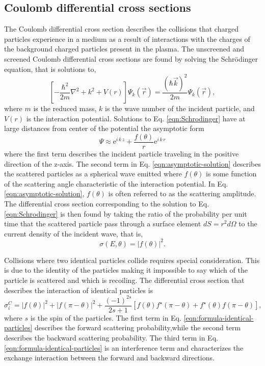 \subsection{Coulomb differential cross sections}
The Coulomb differential cross section describes the collisions that charged particles experience in a medium as a result of interactions with the charges of the background charged particles present in the plasma. The unscreened and screened Coulomb differential cross sections are found by solving the Schr\"{o}dinger equation, that is solutions to,
\begin{equation} \label{eqn:Schrodinger}
    \left[-\dfrac{\hbar^2}{2 m}\nabla^2 + k^2 + V(r)\right] \Psi_k(\vec{r}) = \dfrac{(\hbar \vec{k})^2}{2m} \Psi_k(\vec{r}),
\end{equation}
where $m$ is the reduced mass, $k$ is the wave number of the incident particle, and $V(r)$ is the interaction potential. Solutions to Eq. \eqref{eqn:Schrodinger} have at large distances from center of the potential the asymptotic form 
\begin{equation}  \label{eqn:asymptotic-solution}
    \Psi \approx \text{e}^{i\,k\,z} + \dfrac{f(\theta)}{r}\text{e}^{i\,k\,r}
\end{equation}
where the first term describes the incident particle traveling in the positive direction of the z-axis. The second term in Eq. \eqref{eqn:asymptotic-solution} describes the scattered particles as a spherical wave emitted where $f(\theta)$ is some function of the scattering angle characteristic of the interaction potential. In Eq. \eqref{eqn:asymptotic-solution}, $f(\theta)$ is often referred to as the scattering amplitude. The differential cross section corresponding to the solution to Eq. \eqref{eqn:Schrodinger} is then found by taking the ratio of the probability per unit time that the scattered particle pass through a surface element $dS = r^2 d\Omega$ to the current density of the incident wave, that is,
\begin{equation} \label{eqn:formula-distinguishable-particles}
    \sigma(E,\theta) = |f(\theta)|^2.
\end{equation}

Collisions where two identical particles collide requires special consideration. This is due to the identity of the particles making it impossible to say which of the particle is scattered and which is recoiling. The differential cross section that describes the interaction of identical particles is
\begin{equation} \label{eqn:formula-identical-particles}
    \sigma_{i}^{C} = | f(\theta) |^2 + | f(\pi - \theta) |^2 + \dfrac{(-1)^{2s}}{2s+1} \left[ f(\theta) f^{\star}(\pi-\theta) + f^{\star}(\theta) f(\pi-\theta) \right],
\end{equation}
where $s$ is the spin of the particles. The first term in Eq. \eqref{eqn:formula-identical-particles} describes the forward scattering probability,while the second term describes the backward scattering probability. The third term in Eq. \eqref{eqn:formula-identical-particles} is an interference term and characterizes the exchange interaction between the forward and backward directions.

